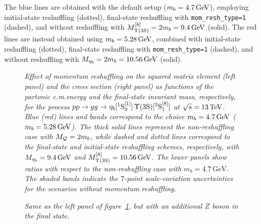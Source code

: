 The blue lines are obtained with the default setup ($m_b=4.7\,{\rm GeV}$), employing initial-state reshuffling (dotted), final-state reshuffling with {\tt mom\_resh\_type=1} (dashed), and without reshuffling with $M^{[8]}_{\Upsilon(3\mathrm{S})}=2m_b=9.4\,{\rm GeV}$ (solid).
The red lines are instead obtained using $m_b = 5.28\,{\rm GeV}$, combined with initial-state reshuffling (dotted), final-state reshuffling with {\tt mom\_resh\_type=1} (dashed), and without reshuffling with $M_{\eta_b}=2m_b=10.56\,{\rm GeV}$ (solid).



\begin{figure}[t]
  \centering    
  
  \caption{\it\small Effect of momentum reshuffling on the squared matrix element (left panel) and the cross section (right panel) as functions of the partonic c.m.\@ energy and the final-state invariant mass, respectively, for the process $pp\to gg \to \eta_b[^1 \mathrm{S}_0^{[1]}]\, \Upsilon(3\mathrm{S})[^3 \mathrm{S}_1^{[8]}]$ at $\sqrt{s}=13\,{\rm TeV}$. Blue (red) lines and bands correspond to the choice $m_b = 4.7\,{\rm GeV}$ ($m_b = 5.28\,{\rm GeV}$). The thick solid lines represent the non-reshuffling case with $M_{\cal Q} = 2 m_b$, while dashed and dotted lines correspond to the final-state and initial-state reshuffling schemes, respectively, with $M_{\eta_b} = 9.4\,{\rm GeV}$ and $M^{[8]}_{\Upsilon(3\mathrm{S})} = 10.56\,{\rm GeV}$. The lower panels show ratios with respect to the non-reshuffling case with $m_b=4.7\,\mathrm{GeV}$. The shaded bands indicate the $7$-point scale-variation uncertainties for the scenarios without momentum reshuffling.}
  \label{fig:etabUps_reshuffle}
\end{figure}



\begin{figure}[t]
    \centering
    
    \caption{\it\small Same as the left panel of figure~\ref{fig:etabUps_reshuffle}, but with an additional $Z$ boson in the final state.}
    \label{fig:etabUpsZ_reshuffle}
\end{figure}

